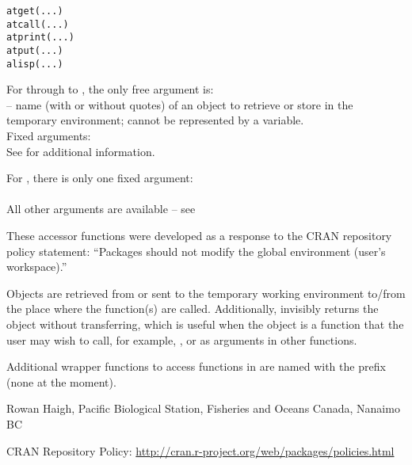 \documentclass[letterpaper]{book}
\begin{document}
%
\begin{Usage}
\begin{verbatim}
atget(...)
atcall(...)
atprint(...)
atput(...)
alisp(...)
\end{verbatim}
\end{Usage}
%
\begin{Arguments}
\begin{ldescription}
\item[\code{...}] For  through to , the only free argument is: \\{}
 -- name (with or without quotes) of an object to retrieve or store 
in the temporary environment; cannot be represented by a variable. \\{}
Fixed arguments:  \\{}
See  for additional information.

For , there is only one fixed argument: \\{}
 \\{}
All other arguments are available -- see  
\end{ldescription}
\end{Arguments}
%
\begin{Details}\relax
These accessor functions were developed as a response to the CRAN
repository policy statement: ``Packages should not modify the
global environment (user's workspace).''

\end{Details}
%
\begin{Value}
Objects are retrieved from or sent to the temporary working 
environment to/from the place where the function(s) are called.
Additionally,  invisibly returns the object without 
transferring, which is useful when the object is a function that the
user may wish to call, for example, , or as 
arguments in other functions.
\end{Value}
%
\begin{Note}\relax
Additional wrapper functions to access functions in 
are named with the prefix  (none at the moment).
\end{Note}
%
\begin{Author}\relax
Rowan Haigh, Pacific Biological Station, Fisheries and Oceans Canada, Nanaimo BC
\end{Author}
%
\begin{References}\relax
CRAN Repository Policy: 
\url{http://cran.r-project.org/web/packages/policies.html}
\end{References}
\end{document}
